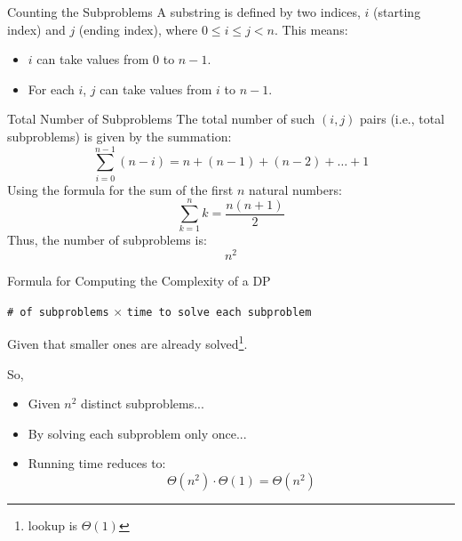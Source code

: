 \documentclass{beamer}
\newcommand{\toRight}[1]{
    \begin{FlushRight}
        {\small #1}
    \end{FlushRight}
}
\begin{document}
\begin{frame}{Counting the Subproblems}
    A substring is defined by two indices, \( i \) (starting index) and \( j \) (ending index), where \( 0 \leq i \leq j < n \). This means:
    \begin{itemize}
        \item \( i \) can take values from \( 0 \) to \( n-1 \).
        \item For each \( i \), \( j \) can take values from \( i \) to \( n-1 \).
    \end{itemize}
\end{frame}

\begin{frame}{Total Number of Subproblems}
    The total number of such \( (i, j) \) pairs (i.e., total subproblems) is given by the summation:
    \[
    \sum_{i=0}^{n-1} (n - i) = n + (n-1) + (n-2) + \dots + 1
    \]
    Using the formula for the sum of the first \( n \) natural numbers:
    \[
    \sum_{k=1}^{n} k = \frac{n(n+1)}{2}
    \]
    Thus, the number of subproblems is:
    \[
    n^2
    \]
\end{frame}

\begin{frame}{Formula for Computing the Complexity of a DP}
    \begin{large}
        \texttt{\# of subproblems} $\times$ \texttt{time to solve each subproblem}
    \end{large}
    \toRight{Given that smaller ones are already solved\footnote{lookup is $\Theta(1)$}.}
    \bigskip
    So,
    \begin{itemize}
        \item Given $n^2$ distinct subproblems...
        \item By solving each subproblem only once...
        \item Running time reduces to:
            {\LARGE
            $$
                \Theta(n^2) \cdot \Theta(1) = \Theta(n^2)
            $$
            }
    \end{itemize}
\end{frame}
\end{document}
